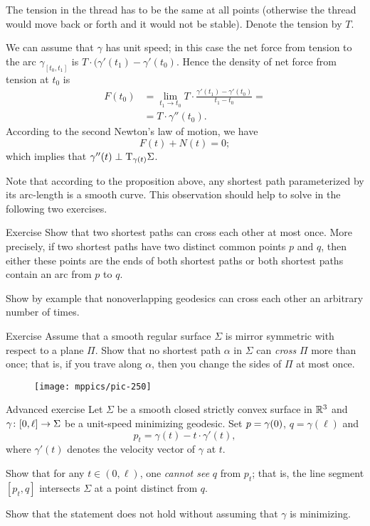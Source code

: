 The tension in the thread has to be the same at all points (otherwise the thread would move back or forth and it would not be stable).
Denote  the tension by $T$.

We can assume that $\gamma$ has unit speed;
in this case the net force from tension to the arc $\gamma_{[t_0,t_1]}$ is $T\cdot(\gamma'(t_1)-\gamma'(t_0)$.
Hence the density of net force from tension at $t_0$ is 
\begin{align*}
F(t_0)&=\lim_{t_1\to t_0}T\cdot\frac{\gamma'(t_1)-\gamma'(t_0)}{t_1-t_0}=
\\
&=T\cdot\gamma''(t_0).
\end{align*}
According to the second Newton's law of motion, we have 
\[F(t)+N(t)=0;\]
which implies that  $\gamma''(t)\perp\mathrm{T}_{\gamma(t)}\Sigma$.
\qeds

Note that according to the proposition above, any shortest path parameterized by its arc-length is a smooth curve.
This observation should help to solve in the following two exercises.

\begin{thm}{Exercise}\label{ex:two-min-geod}
Show that two shortest paths can cross each other at most once.
More precisely, if two shortest paths have two distinct common points $p$ and $q$, then either these points are the ends of both shortest paths or both shortest paths contain an arc from $p$ to $q$.

Show by example that nonoverlapping geodesics can cross each other an arbitrary number of times.
\end{thm}

\begin{thm}{Exercise}\label{ex:min-geod+plane}
Assume that a smooth regular surface $\Sigma$ is mirror symmetric with respect to a plane $\Pi$.
Show that no shortest path $\alpha$ in $\Sigma$ can \emph{cross} $\Pi$ more than once;
that is, if you trave along $\alpha$, then you change the sides of $\Pi$ at most once. 
\end{thm}

{

\begin{wrapfigure}{r}{48 mm}
\vskip-4mm
\centering
\texttt{[image: mppics/pic-250]}
\vskip-0mm
\end{wrapfigure}

\begin{thm}{Advanced exercise}\label{ex:milka}
Let $\Sigma$ be a smooth closed strictly convex surface 
in $\mathbb{R}^3$ 
and $\gamma\:[0,\ell]\z\to \Sigma$ be a unit-speed minimizing geodesic.
Set $p\z=\gamma(0)$, $q=\gamma(\ell)$ and 
$$p_t=\gamma(t)-t\cdot\gamma'(t),$$ 
where $\gamma'(t)$ denotes the velocity vector of $\gamma$ at $t$.

Show that for any $t\in (0,\ell)$,
one {}\emph{cannot see}  $q$ from $p_t$;
that is, the line segment $[p_t,q]$ intersects $\Sigma$ at a point distinct from $q$.

Show that the statement does not hold without assuming that $\gamma$ is minimizing.
\end{thm}

}


